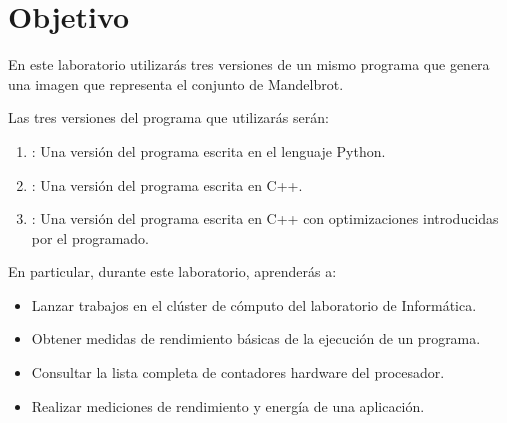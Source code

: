 \section{Objetivo}

En este laboratorio utilizarás tres versiones de un mismo programa
que genera una imagen que representa el conjunto de Mandelbrot.

Las tres versiones del programa que utilizarás serán:

\begin{enumerate}
  \item {}: Una versión del programa escrita en el lenguaje Python.
  \item {}: Una versión del programa escrita en C++.
  \item {}: Una versión del programa escrita en C++
        con optimizaciones introducidas por el programado.
\end{enumerate}

En particular, durante este laboratorio, aprenderás a:


\begin{itemize}

  \item Lanzar trabajos en el clúster de cómputo del laboratorio de Informática.
  \item Obtener medidas de rendimiento básicas de la ejecución de un programa.
  \item Consultar la lista completa de contadores hardware del procesador.
  \item Realizar mediciones de rendimiento y energía de una aplicación.
\end{itemize}
